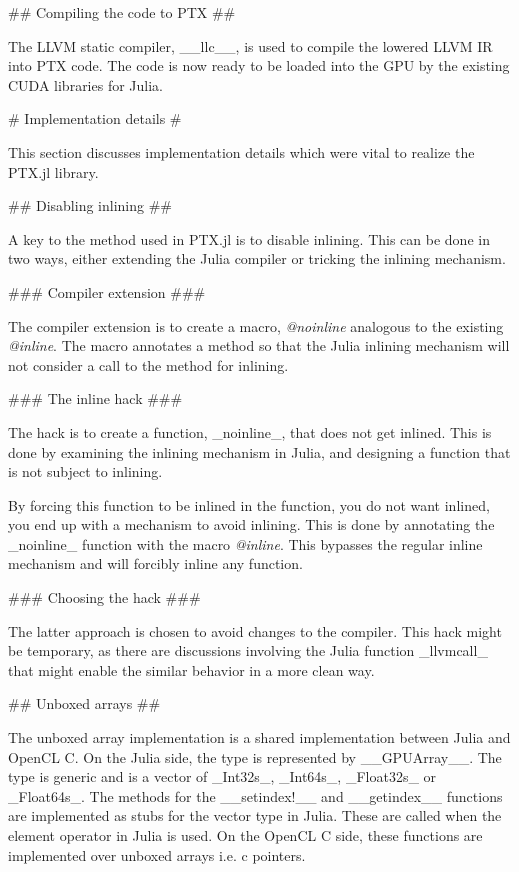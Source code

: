 \begin{markdown}
## Compiling the code to PTX ##

The LLVM static compiler, __llc__, is used to compile the lowered LLVM
IR into PTX code. The code is now ready to be loaded into the GPU by
the existing CUDA libraries for Julia.

# Implementation details #
\label{sec:implementation-details}

This section discusses implementation details which were vital
to realize the PTX.jl library.

## Disabling inlining ##

A key to the method used in PTX.jl is to disable inlining. This can be
done in two ways, either extending the Julia compiler or tricking the
inlining mechanism.

### Compiler extension ###

The compiler extension is to create a macro, \textit{@noinline} analogous to
the existing \textit{@inline}. The macro annotates a method so that the Julia
inlining mechanism will not consider a call to the method for
inlining.

### The inline hack ###

The hack is to create a function, _noinline_, that does not get
inlined. This is done by examining the inlining mechanism in Julia, and
designing a function that is not subject to inlining.

By forcing this function to be inlined in the function, you do not want
inlined, you end up with a mechanism to avoid inlining. This is done
by annotating the _noinline_ function with the macro \textit{@inline}. This
bypasses the regular inline mechanism and will forcibly inline any
function.

### Choosing the hack ###

The latter approach is chosen to avoid changes to the compiler. This
hack might be temporary, as there are discussions involving the Julia
function _llvmcall_ that might enable the similar behavior in a more
clean way.

## Unboxed arrays ##
\label{sec:implementation-details-unboxed}

The unboxed array implementation is a shared implementation between
Julia and OpenCL C. On the Julia side, the type is represented by
__GPUArray__. The type is generic and is a vector of _Int32s_,
_Int64s_, _Float32s_ or _Float64s_. The methods for the __setindex!__
and __getindex__ functions are implemented as stubs for the vector
type in Julia. These are called when the element operator in Julia is
used. On the OpenCL C side, these functions are implemented over
unboxed arrays i.e. c pointers. 


\end{markdown}
